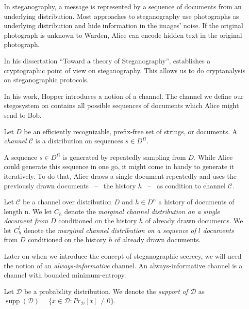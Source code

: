 In steganography, a message is represented by a sequence of documents from an underlying distribution.
Most approaches to steganography use photographs as underlying distribution and hide information in the images' noise.
If the original photograph is unknown to Warden, Alice can encode hidden text in the original photograph.

In his dissertation ``Toward a theory of Steganography'', \cite{Hopper2004} establishes a cryptographic point of view on steganography. 
This allows us to do cryptanalysis on steganographic protocols.

In his work, Hopper introduces a notion of a channel.
The channel we define our stegosystem on contains all possible sequences of documents which Alice might send to Bob.

\begin{definition}
Let $D$ be an efficiently recognizable, prefix-free set of strings, or documents.
A \emph{channel} $\mathcal{C}$ is a distribution on sequences $s \in D^\Omega$.
\end{definition}

A sequence $s \in D^\Omega$ is generated by repeatedly sampling from $D$.
While Alice could generate this sequence in one go, it might come in handy to generate it iteratively.
To do that, Alice draws a single document repeatedly and uses the previously drawn documents~ --~ the history $h$~ --~ as condition to channel $\mathcal{C}$.

\begin{definition}
Let $\mathcal{C}$ be a channel over distribution $D$ and $h \in D^n$ a history of documents of length n.
We let $C_h$ denote the \emph{marginal channel distribution on a single document from $D$} conditioned on the history $h$ of already drawn documents.
We let $C_h^l$ denote the \emph{marginal channel distribution on a sequence of $l$ documents} from $D$ conditioned on the history $h$ of already drawn documents.
\end{definition}

Later on when we introduce the concept of steganographic secrecy, we will need the notion of an \emph{always-informative} channel. An always-informative channel is a channel with bounded minimum-entropy.

\begin{definition}[Support]
Let $\mathcal{D}$ be a probability distribution.
We denote the \emph{support of $\mathcal{D}$} as $\mathop{supp}(\mathcal{D}) = \{ x \in \mathcal{D} \colon Pr_{\mathcal{D}}[x] \neq 0 \}$.
\end{definition}

